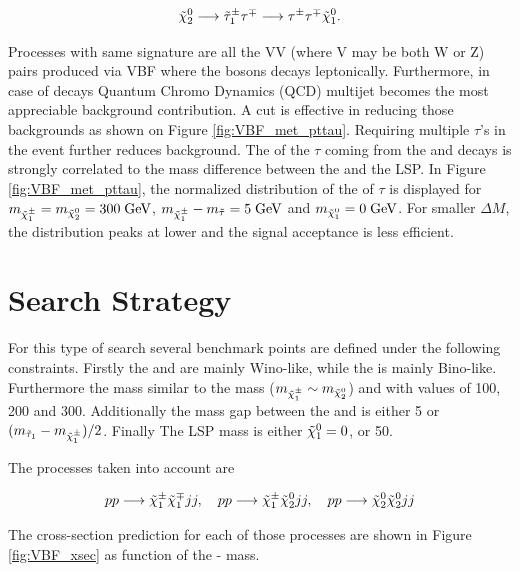 \begin{equation}
\tilde{\chi}^{0}_{2} \longrightarrow \tilde{\tau}_{1}^{\pm} \tau^{\mp} \longrightarrow \tau^{\pm} \tau^{\mp} \tilde{\chi}^{0}_{1}.
\end{equation}

Processes with same signature are all the VV (where V may be both W or Z) pairs produced via VBF where the bosons decays leptonically. Furthermore, in case of \hadtau decays Quantum Chromo Dynamics (QCD) multijet becomes the most appreciable background contribution. A \met cut is effective in reducing those backgrounds as shown on Figure \ref{fig:VBF_met_pttau}. Requiring multiple $\tau$’s in the event further reduces background. The \pt of the \ensuremath{\tau} coming from the \charginopm and \neutralinotwo decays is strongly correlated to the mass difference between the \charginopm and the \neutralinoone LSP. In Figure \ref{fig:VBF_met_pttau}, the normalized distribution of the \pt of \ensuremath{\tau} is displayed for \ensuremath{m_{\charginopm} = m_{\neutralinotwo} = 300\gev}, \ensuremath{m_{\charginopm} - m_{\tilde{\tau}} = 5\gev} and \ensuremath{m_{\neutralinoone} = 0\gev}. For smaller \ensuremath{\Delta M}, the distribution peaks at lower \pt and the signal acceptance is less efficient.

\section {Search Strategy}
\label{section::search_strategy}

For this type of search several benchmark points are defined under the following constraints. Firstly the \charginopm and \neutralinotwo are mainly Wino-like, while the \neutralinoone is mainly Bino-like. Furthermore the \charginomp mass similar to the \neutralinotwo mass ($m_{\tilde{\chi}^{\pm}_{1}} \sim m_{\tilde{\chi}^{0}_{2}}$) and with values of 100, 200 and 300\gev. Additionally the mass gap between the \stau and \charginopm is either 5 \gev or $(m_{\tilde{\tau}_{1}} - m_{\tilde{\chi}^{\pm}_{1}})/2$. Finally The LSP mass is either $\tilde{\chi}^{0}_{1} = 0$, or 50\gev.

The processes taken into account are

\begin{equation}
pp \longrightarrow \tilde{\chi}^{\pm}_{1} \tilde{\chi}^{\mp}_{1} jj, \quad pp \longrightarrow \tilde{\chi}^{\pm}_{1} \tilde{\chi}^{0}_{2} jj, \quad pp \longrightarrow \tilde{\chi}^{0}_{2} \tilde{\chi}^{0}_{2} jj
\end{equation}

The cross-section prediction for each of those processes are shown in Figure \ref{fig:VBF_xsec} as function of the \charginomp - \neutralinotwo mass.


